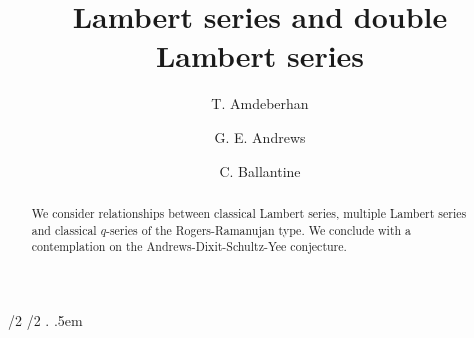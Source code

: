 \documentclass[a4paper,reqno,12pt]{amsart}
\begin{document}
    
\newtheorem{theorem}{Theorem}[section]
\newtheorem{lemma}[theorem]{Lemma}
\newtheorem{corollary}[theorem]{Corollary}
\newtheorem{conjecture}[theorem]{Conjecture}
\newtheorem{proposition}[theorem]{Proposition}

\newtheorem{definition}[theorem]{Definition}
\newtheorem{example}[theorem]{Example}
\newtheorem{xca}[theorem]{Exercise}

\newcommand{\ccom}[1]{{\color{teal}{ #1}}}




    {\dimexpr\topsep/2\relax} %
    {\dimexpr\topsep/2\relax} %
    {}          %
    {}          %
    {\bfseries} %
    {.}         %
    {.5em}      %
    {}          %

\theoremstyle{remark}
\newtheorem{remark}{Remark}[section]


\allowdisplaybreaks



\makeatletter
{}
\makeatother




\title{Lambert series and double Lambert series}

\begin{abstract}
We consider relationships between classical Lambert series, multiple Lambert series and classical $q$-series of the Rogers-Ramanujan type. We conclude with a contemplation on the Andrews-Dixit-Schultz-Yee conjecture.    
\end{abstract}


\author{T. Amdeberhan}
\address{Department of Mathematics\\ Tulane University\\ New Orleans, LA 70118, USA}

\author{G. E. Andrews}
\address{Department of Mathematics\\ Penn State University\\ University Park, PA 16802, USA}

\author{C. Ballantine}
\address{Department of Mathematics and Computer Science\\ College of the Holy Cross \\ Worcester, MA 01610, USA \\} 
\end{document}
